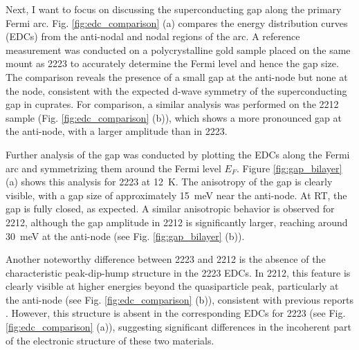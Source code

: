 Next, I want to focus on discussing the superconducting gap along the primary Fermi arc.
Fig. \ref{fig:edc_comparison} (a) compares the energy distribution curves (EDCs) from the anti-nodal and nodal regions of the arc.
A reference measurement was conducted on a polycrystalline gold sample placed on the same mount as 2223 to accurately determine the Fermi level and hence the gap size.
The comparison reveals the presence of a small gap at the anti-node but none at the node, consistent with the expected d-wave symmetry of the superconducting gap in cuprates.
For comparison, a similar analysis was performed on the 2212 sample (Fig. \ref{fig:edc_comparison} (b)), which shows a more pronounced gap at the anti-node, with a larger amplitude than in 2223.

Further analysis of the gap was conducted by plotting the EDCs along the Fermi arc and symmetrizing them around the Fermi level $E_F$.
Figure \ref{fig:gap_bilayer} (a) shows this analysis for 2223 at \qty{12}{\kelvin}.
The anisotropy of the gap is clearly visible, with a gap size of approximately \qty{15}{\milli\electronvolt} near the anti-node.
At RT, the gap is fully closed, as expected.
A similar anisotropic behavior is observed for 2212, although the gap amplitude in 2212 is significantly larger, reaching around \qty{30}{\milli\electronvolt} at the anti-node (see Fig. \ref{fig:gap_bilayer} (b)).

Another noteworthy difference between 2223 and 2212 is the absence of the characteristic peak-dip-hump structure in the 2223 EDCs.
In 2212, this feature is clearly visible at higher energies beyond the quasiparticle peak, particularly at the anti-node (see Fig. \ref{fig:edc_comparison} (b)), consistent with previous reports \cite{kordyuk_origin_2002}.
However, this structure is absent in the corresponding EDCs for 2223 (see Fig. \ref{fig:edc_comparison} (a)), suggesting significant differences in the incoherent part of the electronic structure of these two materials.

